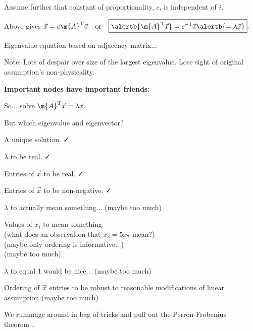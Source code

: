     Assume further that constant of proportionality, $c$,
    is independent of $i$.
   
    Above gives 
    $
    \vec{x} = c \m{A}^{\textnormal{T}} \vec{x}
    {
      \quad \textnormal{or} \quad
      \boxed{\alertb{\m{A}^{\textnormal{T}} \vec{x}} = c^{-1} \vec{x} \alertb{= \lambda \vec{x}}}.}
    $
  
    Eigenvalue equation based on adjacency matrix...
  
    Note: Lots of despair over size of the largest eigenvalue.\cite{wasserman1994a}
    {Lose sight of original assumption's non-physicality.}
  


  \textbf{Important nodes have important friends:}

  
  
    So...  solve $\m{A}^{\textnormal{T}} \vec{x} = \lambda \vec{x}$.
  
    But which eigenvalue and eigenvector?
  
    
    
      A unique solution. {\alert{\faCheck}}
    
      $\lambda$ to be real. {\alert{\faCheck}}
    
      Entries of $\vec{x}$ to be real. {\alert{\faCheck}}
    
      Entries of $\vec{x}$ to be non-negative. {\alert{\faCheck}}
    
      $\lambda$ to actually mean something...  
      {
        \alert{(maybe too much)}
      }
    
      Values of $x_i$ to mean something\\
      (what does an observation that $x_3 = 5 x_7$ mean?)\\
      (maybe only ordering is informative...)\\
      {
        \alert{(maybe too much)}
      }
    
      $\lambda$ to equal 1 would be nice...
      {
        \alert{(maybe too much)}
      }
    
      Ordering of $\vec{x}$ entries to be robust
      to reasonable modifications of linear assumption
      {
        \alert{(maybe too much)}
      }
    
  
    {
      We rummage around in bag of tricks and pull out
      the Perron-Frobenius theorem...
    }
  



  \textbf{}

